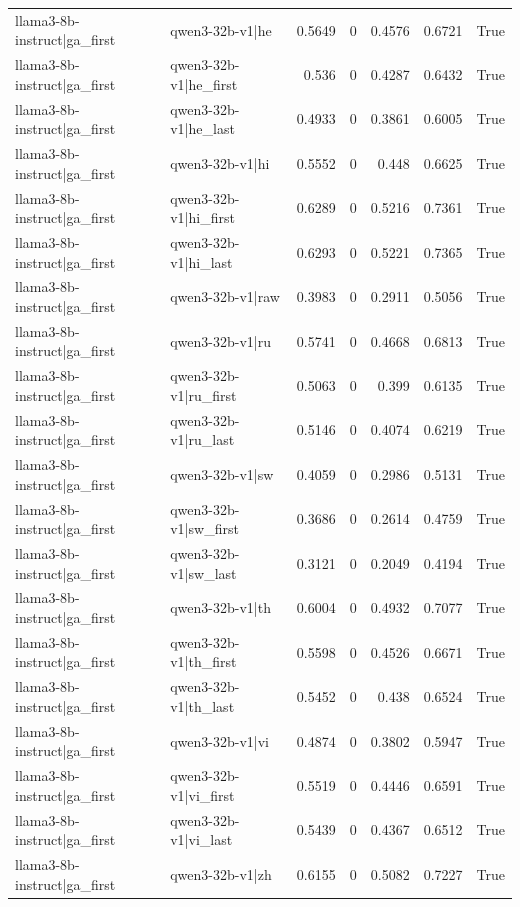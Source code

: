 \begin{table}
\begin{tabular}{l l r r r r l}
llama3-8b-instruct|ga_first & qwen3-32b-v1|he & 0.5649 & 0 & 0.4576 & 0.6721 & True \\
llama3-8b-instruct|ga_first & qwen3-32b-v1|he_first & 0.536 & 0 & 0.4287 & 0.6432 & True \\
llama3-8b-instruct|ga_first & qwen3-32b-v1|he_last & 0.4933 & 0 & 0.3861 & 0.6005 & True \\
llama3-8b-instruct|ga_first & qwen3-32b-v1|hi & 0.5552 & 0 & 0.448 & 0.6625 & True \\
llama3-8b-instruct|ga_first & qwen3-32b-v1|hi_first & 0.6289 & 0 & 0.5216 & 0.7361 & True \\
llama3-8b-instruct|ga_first & qwen3-32b-v1|hi_last & 0.6293 & 0 & 0.5221 & 0.7365 & True \\
llama3-8b-instruct|ga_first & qwen3-32b-v1|raw & 0.3983 & 0 & 0.2911 & 0.5056 & True \\
llama3-8b-instruct|ga_first & qwen3-32b-v1|ru & 0.5741 & 0 & 0.4668 & 0.6813 & True \\
llama3-8b-instruct|ga_first & qwen3-32b-v1|ru_first & 0.5063 & 0 & 0.399 & 0.6135 & True \\
llama3-8b-instruct|ga_first & qwen3-32b-v1|ru_last & 0.5146 & 0 & 0.4074 & 0.6219 & True \\
llama3-8b-instruct|ga_first & qwen3-32b-v1|sw & 0.4059 & 0 & 0.2986 & 0.5131 & True \\
llama3-8b-instruct|ga_first & qwen3-32b-v1|sw_first & 0.3686 & 0 & 0.2614 & 0.4759 & True \\
llama3-8b-instruct|ga_first & qwen3-32b-v1|sw_last & 0.3121 & 0 & 0.2049 & 0.4194 & True \\
llama3-8b-instruct|ga_first & qwen3-32b-v1|th & 0.6004 & 0 & 0.4932 & 0.7077 & True \\
llama3-8b-instruct|ga_first & qwen3-32b-v1|th_first & 0.5598 & 0 & 0.4526 & 0.6671 & True \\
llama3-8b-instruct|ga_first & qwen3-32b-v1|th_last & 0.5452 & 0 & 0.438 & 0.6524 & True \\
llama3-8b-instruct|ga_first & qwen3-32b-v1|vi & 0.4874 & 0 & 0.3802 & 0.5947 & True \\
llama3-8b-instruct|ga_first & qwen3-32b-v1|vi_first & 0.5519 & 0 & 0.4446 & 0.6591 & True \\
llama3-8b-instruct|ga_first & qwen3-32b-v1|vi_last & 0.5439 & 0 & 0.4367 & 0.6512 & True \\
llama3-8b-instruct|ga_first & qwen3-32b-v1|zh & 0.6155 & 0 & 0.5082 & 0.7227 & True \\

\end{tabular}
\end{table}
